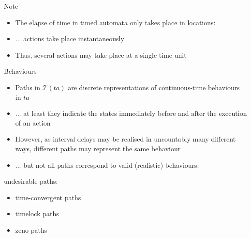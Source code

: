 \documentclass{beamer}
\def\dgold#1{{\darkgoldenrod #1}}
\def\dkb#1{{\blue #1}}
\def\TL#1{\mathcal{T}(#1)}
\begin{document}
\begin{slide}{Note}
\small

\begin{itemize}
\item The elapse of time in timed automata \dkb{only} takes place in locations:
\item ... actions take place instantaneously 
\item Thus, several actions may take place at a single time unit
\end{itemize}
\end{slide}

\begin{slide}{Behaviours}
\small

\begin{itemize}
\item Paths in $\TL{ta}$ are \dkb{discrete representations of continuous-time behaviours} in $ta$
\item ... at least they indicate the states immediately before and after the execution of an action
\item However, as interval delays may be realised in \dgold{uncountably} many different ways, different paths 
may represent the same behaviour
\pause
\item ... but not all paths correspond to valid  (\dkb{realistic}) behaviours:
\end{itemize}

\begin{block}{undesirable paths:}
\begin{itemize}
\item  \dkb{time-convergent} paths
\item  \dkb{timelock} paths
\item  \dkb{zeno} paths
\end{itemize}
\end{block}
\end{slide}
\end{document}
